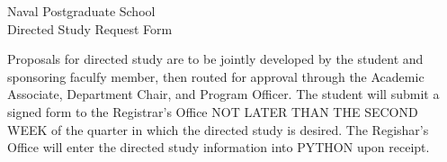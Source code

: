 \documentclass{article}
\begin{document}
\posttitle{\par\end{center}}
\setlength{\droptitle}{-10pt}
\newcommand{\sigspace}{\uline{\hspace{2in}}}
\newcommand{\datespace}{\uline{\hspace{.75in}}}
\newcommand{\shortspace}{\uline{\hspace{.75in}}}
\newcommand{\longspace}{\uline{\hspace{2in}}}
\newcommand{\HRule}{\rule{\linewidth}{0.1mm}}
\newcommand{\HRuleThick}{\rule{\linewidth}{0.3mm}}
\begin{centering}
\Large Naval Postgraduate School\\                                                                                 
\Large Directed Study Request Form\\
\end{centering}

\begin{framed}
  \noindent Proposals for directed study are to be jointly developed by the student and sponsoring faculfy
  member, then routed for approval through the Academic Associate, Department Chair, and
  Program Officer. The student will submit a signed form to the Registrar's Office NOT LATER
  THAN THE SECOND WEEK of the quarter in which the directed study is desired. The
  Regishar's Office will enter the directed study information into PYTHON upon receipt.
\end{framed}
\end{document}
